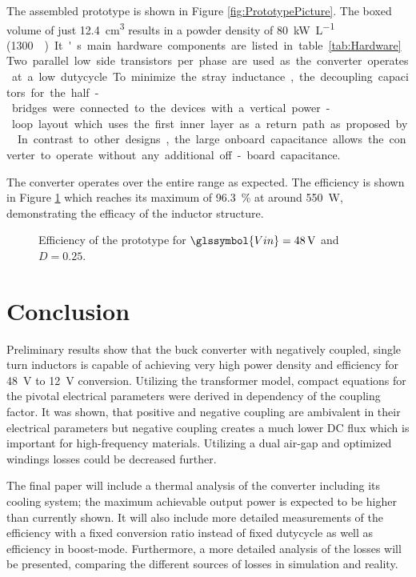\documentclass{IPEC2026}
\newcommand{\sbl}[1]{\glssymbol{#1}}
\begin{document}
The assembled prototype is shown in Figure \ref{fig:PrototypePicture}. The boxed volume of just \qty{12.4}{\cubic\cm} results in a powder density of \qty{80}{\kW\per\liter} (\qty{1300}{\W\per\cubic\inch}). It's main hardware components are listed in table \ref{tab:Hardware}. Two parallel low side transistors per phase are used as the converter operates at a low dutycycle. To minimize the stray inductance, the decoupling capacitors for the half-bridges were connected to the devices with a vertical power-loop layout which uses the first inner layer as a return path as proposed by \cite{reuschUnderstandingEffectPCB2014}. In contrast to other designs, the large onboard capacitance allows the converter to operate without any additional off-board capacitance. \par
The converter operates over the entire range as expected. The efficiency is shown in Figure \ref{fig:Efficiency} which reaches its maximum of \qty{96.3}{\percent} at around \qty{550}{\W}, demonstrating the efficacy of the inductor structure.  %

\begin{figure}
  \centering
  
  \caption{Efficiency of the prototype for $\sbl{Vin}=\qty{48}{\V}$ and $D=0.25$.}
  \label{fig:Efficiency}
\end{figure}

\section{Conclusion}
Preliminary results show that the buck converter with negatively coupled, single turn inductors is capable of achieving very high power density and efficiency for \qty{48}{\V} to \qty{12}{\V} conversion. Utilizing the transformer model, compact equations for the pivotal electrical parameters were derived in dependency of the coupling factor. It was shown, that positive and negative coupling are ambivalent in their electrical parameters but negative coupling creates a much lower DC flux which is important for high-frequency materials. Utilizing a dual air-gap and optimized windings losses could be decreased further. \par
The final paper will include a thermal analysis of the converter including its cooling system; the maximum achievable output power is expected to be higher than currently shown. It will also include more detailed measurements of the efficiency with a fixed conversion ratio instead of fixed dutycycle as well as efficiency in boost-mode. Furthermore, a more detailed analysis of the losses will be presented, comparing the different sources of losses in simulation and reality.



\end{document}
